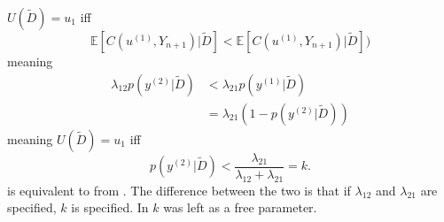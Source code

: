 \begin{example}
	$U(\tilde{D})=u_1$ iff
	\begin{equation}
		\mathbb{E}[C(u^{(1)},Y_{n+1})|\tilde{D}]<\mathbb{E}[C(u^{(1)},Y_{n+1})|\tilde{D}])
	\end{equation}
	meaning
	\begin{equation}
		\begin{split}
			\lambda_{12}p(y^{(2)}|\tilde{D})&<\lambda_{21}p(y^{(1)}|\tilde{D})\\
			&=\lambda_{21}(1-p(y^{(2)}|\tilde{D}))
		\end{split}
	\end{equation}
	meaning $U(\tilde{D}) = u_1$ iff
	\begin{equation}
		p(y^{(2)}|\tilde{D})<\frac{\lambda_{21}}{\lambda_{12}+\lambda_{21}}=k.
		\label{eq:threshold31}
	\end{equation}
	 is equivalent to  from . The difference between the two is that if $\lambda_{12}$ and $\lambda_{21}$ are specified, $k$ is specified. In  $k$ was left as a free parameter.
\end{example}


